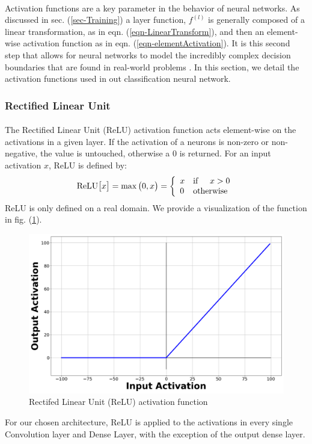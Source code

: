 \documentclass[12pt,letterpaper]{article}
\begin{document}
\paragraph*{}Activation functions are a key parameter in the behavior of neural networks. As discussed in sec. (\ref{sec-Training}) a layer function, $f^{(l)}$ is generally composed of a linear transformation, as in eqn. (\ref{eqn-LinearTransform}), and then an element-wise activation function as in eqn. (\ref{eqn-elementActivation}). It is this second step that allows for neural networks to model the incredibly complex decision boundaries that are found in real-world problems \cite{Geron,Loy}. In this section, we detail the activation functions used in out classification neural network. 

\subsubsection{Rectified Linear Unit}

\paragraph*{}The Rectified Linear Unit (ReLU) activation function acts element-wise on the activations in a given layer. If the activation of a neurons is non-zero or non-negative, the value is untouched, otherwise a $0$ is returned. For an input activation $x$, ReLU is defined by:
\begin{equation}
\label{eqn-ReLU}
\text{ReLU}\big[x\big] = \max\big(0,x\big) = \left\{
\begin{array}{ll}
    x & \text{if\hspace{0.5cm}} x > 0 \\
    0 & \text{otherwise}
\end{array} 
\right.
\end{equation}
ReLU is only defined on a real domain. We provide a visualization of the function in fig. (\ref{fig-ReLU}).
\begin{figure}[H]
\label{fig-ReLU}
\begin{center}
\includegraphics[scale=0.2]{../Figures/RectifiedLinearUnit}
\end{center}
\caption{Rectifed Linear Unit (ReLU) activation function}
\end{figure}
For our chosen architecture, ReLU is applied to the activations in every single Convolution layer and Dense Layer, with the exception of the output dense layer.
\end{document}
